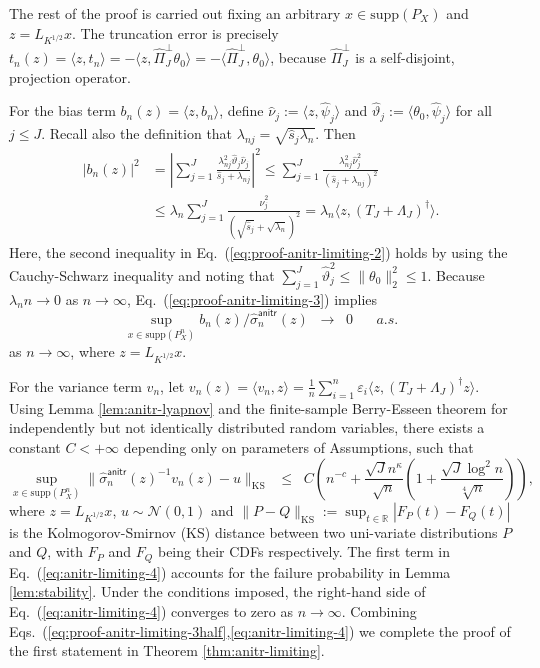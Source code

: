\documentclass[11pt,a4paper]{article}
\newcommand{\ks}{\mathrm{KS}}
\renewcommand{\hat}{\widehat}
\theoremstyle{definition}
\theoremstyle{plain}
\theoremstyle{remark}
\newcommand{\supp}{\mathrm{supp}}
\newcommand{\anitr}{\mathsf{anitr}}
\begin{document}
The rest of the proof is carried out fixing an arbitrary $x\in\supp(P_X)$ and $z=L_{K^{1/2}}x$. 
The truncation error is precisely $t_n(z)=\langle z, t_n\rangle = -\langle z, \hat\Pi_J^\perp\theta_0\rangle = -\langle \hat\Pi_J^\perp,\theta_0\rangle$, 
because $\hat\Pi_J^\perp$ is a self-disjoint, projection operator.

For the bias term $b_n(z)=\langle z,b_n\rangle$, define $\hat\nu_j := \langle z,\hat\psi_j\rangle$ and $\hat\vartheta_j := \langle \theta_0,\hat\psi_j\rangle$ for all $j\leq J$. 
Recall also the definition that $\lambda_{nj} = \sqrt{\hat s_j\lambda_n}$. Then
\begin{align}
\big|b_n(z)\big|^2 &= \left|\sum_{j=1}^J\frac{\lambda_{nj}^2\hat\vartheta_j\hat\nu_j}{\hat s_j+\lambda_{nj}}\right|^2 \leq \sum_{j=1}^J\frac{\lambda_{nj}^2\hat\nu_j^2}{(\hat s_j+\lambda_{nj})^2}\label{eq:proof-anitr-limiting-2}\\
&\leq \lambda_n\sum_{j=1}^J\frac{\hat\nu_j^2}{(\sqrt{\hat s_j}+\sqrt{\lambda_n})^2} = \lambda_n\langle z, (T_J+\Lambda_J)^\dagger\rangle.\label{eq:proof-anitr-limiting-3}
\end{align}
Here, the second inequality in Eq.~(\ref{eq:proof-anitr-limiting-2}) holds by using the Cauchy-Schwarz inequality and noting that $\sum_{j=1}^J\hat\vartheta_j^2\leq \|\theta_0\|_2^2\leq 1$.
Because $\lambda_n n\to0$ as $n\to\infty$, Eq.~(\ref{eq:proof-anitr-limiting-3}) implies
\begin{equation}
\sup_{x\in \supp(P_X^n)}b_n(z)/\hat\sigma_n^\anitr(z)\;\;\to\;\;0\;\;\;\;\;\;a.s.
\label{eq:proof-anitr-limiting-3half}
\end{equation}
as $n\to\infty$, where $z=L_{K^{1/2}}x$.

For the variance term $v_n$, let $v_n(z)= \langle v_n,z\rangle = \frac{1}{n}\sum_{i=1}^n\varepsilon_i \langle z, (T_J+\Lambda_J)^\dagger z\rangle$.
Using Lemma \ref{lem:anitr-lyapnov} and the finite-sample Berry-Esseen theorem for independently but not identically distributed random variables, there exists a constant $C<+\infty$
depending only on parameters of Assumptions, such that
\begin{equation}
\sup_{x\in\supp(P_X^n)} \|\hat\sigma_n^\anitr(z)^{-1}v_n(z) - u\|_{\ks} \;\;\leq\;\; C\left(n^{-c} + \frac{\sqrt{J}n^{\kappa}}{\sqrt{n}} \left(1+\frac{\sqrt{J}\log^2 n}{\sqrt[4]{n}}\right)\right),
\label{eq:anitr-limiting-4}
\end{equation}
where $z=L_{K^{1/2}}x$, $u\sim\mathcal N(0,1)$ and $\|P-Q\|_\ks := \sup_{t\in\mathbb R}|F_P(t)-F_Q(t)|$ is the Kolmogorov-Smirnov (KS) distance between two uni-variate distributions $P$ and $Q$,
with $F_P$ and $F_Q$ being their CDFs respectively.
The first term in Eq.~(\ref{eq:anitr-limiting-4}) accounts for the failure probability in Lemma \ref{lem:stability}.
Under the conditions imposed, the right-hand side of Eq.~(\ref{eq:anitr-limiting-4}) converges to zero as $n\to\infty$.
Combining Eqs.~(\ref{eq:proof-anitr-limiting-3half},\ref{eq:anitr-limiting-4}) we complete the proof of the first statement in Theorem \ref{thm:anitr-limiting}.
\end{document}
